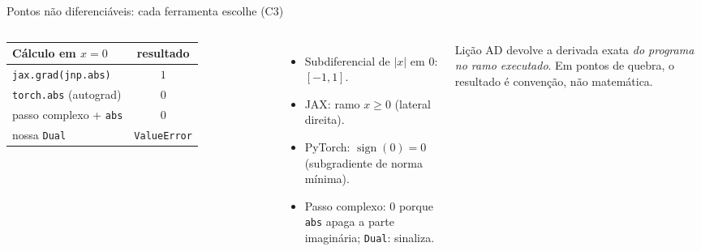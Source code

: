 \documentclass[aspectratio=169,11pt]{beamer}
\begin{document}
\begin{frame}{Pontos não diferenciáveis: cada ferramenta escolhe (C3)}
  \begin{columns}[c]
    \centering
    \renewcommand{\arraystretch}{1.2}
    \begin{tabular}{lc}
      \toprule
      Cálculo em $x=0$ & resultado \\
      \midrule
      \texttt{jax.grad(jnp.abs)} & $1$ \\
      \texttt{torch.abs} (autograd) & $0$ \\
      passo complexo + \texttt{abs} & $0$ \\
      nossa \texttt{Dual} & \texttt{ValueError} \\
      \bottomrule
    \end{tabular}
    \begin{itemize}
      \item Subdiferencial de $|x|$ em $0$: $[-1,1]$.
      \item JAX: ramo $x\ge0$ (lateral direita).
      \item PyTorch: $\operatorname{sign}(0)=0$ (subgradiente de norma mínima).
      \item Passo complexo: $0$ porque \texttt{abs} apaga a parte imaginária; \texttt{Dual}: sinaliza.
    \end{itemize}
    \vspace{0.5em}
    \begin{alertblock}{Lição}
      AD devolve a derivada exata \emph{do programa no ramo executado}. Em pontos de quebra, o resultado é convenção, não matemática.
    \end{alertblock}
  \end{columns}
\end{frame}
\end{document}
